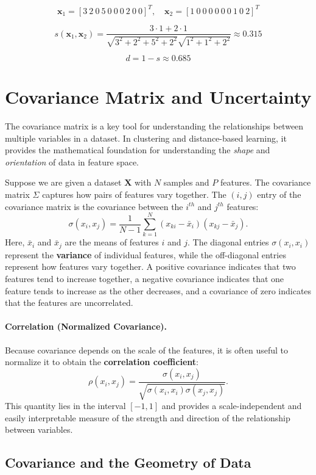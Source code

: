 \documentclass{article}
\begin{document}
\[
\mathbf{x}_1=[3\ 2\ 0\ 5\ 0\ 0\ 0\ 2\ 0\ 0]^T,\quad
\mathbf{x}_2=[1\ 0\ 0\ 0\ 0\ 0\ 0\ 1\ 0\ 2]^T
\]

\[
s(\mathbf{x}_1,\mathbf{x}_2)=
\frac{3\cdot1+2\cdot1}{\sqrt{3^2+2^2+5^2+2^2}\sqrt{1^2+1^2+2^2}}
\approx 0.315
\]

\[
d=1-s\approx 0.685
\]


\section{Covariance Matrix and Uncertainty}

The covariance matrix is a key tool for understanding the relationships between 
multiple variables in a dataset. In clustering and distance-based learning, it 
provides the mathematical foundation for understanding the \textit{shape} and 
\textit{orientation} of data in feature space.

Suppose we are given a dataset $\mathbf{X}$ with $N$ samples and $P$ features. 
The covariance matrix $\Sigma$ captures how pairs of features vary together. 
The $(i,j)$ entry of the covariance matrix is the covariance between the 
$i^{th}$ and $j^{th}$ features:
\[
\sigma(x_i, x_j) = \frac{1}{N-1} \sum_{k=1}^{N} (x_{ki} - \bar{x}_i)(x_{kj} - \bar{x}_j).
\]
Here, $\bar{x}_i$ and $\bar{x}_j$ are the means of features $i$ and $j$.  
The diagonal entries $\sigma(x_i,x_i)$ represent the \textbf{variance} of 
individual features, while the off-diagonal entries represent how features vary 
together. A positive covariance indicates that two features tend to increase 
together, a negative covariance indicates that one feature tends to increase as 
the other decreases, and a covariance of zero indicates that the features are 
uncorrelated.

\paragraph{Correlation (Normalized Covariance).}
Because covariance depends on the scale of the features, it is often useful to 
normalize it to obtain the \textbf{correlation coefficient}:
\[
\rho(x_i,x_j)=\frac{\sigma(x_i,x_j)}
{\sqrt{\sigma(x_i,x_i)\sigma(x_j,x_j)}}.
\]
This quantity lies in the interval $[-1,1]$ and provides a scale-independent and 
easily interpretable measure of the strength and direction of the relationship 
between variables.

\subsection*{Covariance and the Geometry of Data}
\end{document}
